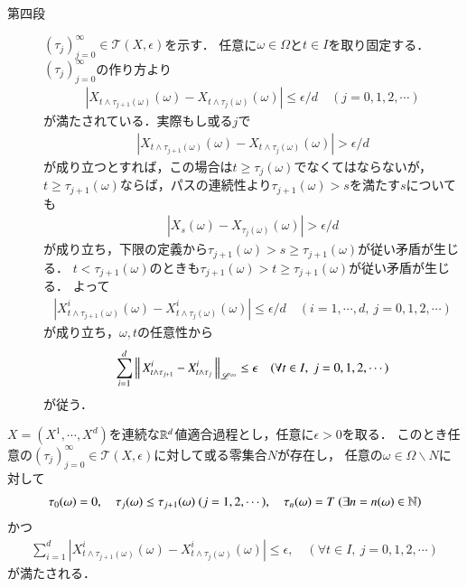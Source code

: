 \begin{prf}
\begin{description}
			\item[第四段]
				$(\tau_j)_{j=0}^{\infty} \in \mathcal{T}(X,\epsilon)$を示す．
				任意に$\omega \in \Omega$と$t \in I$を取り固定する．
				$(\tau_j)_{j=0}^{\infty}$の作り方より
				\begin{align}
					\left| X_{t \wedge \tau_{j+1}(\omega)}(\omega) - X_{t \wedge \tau_j(\omega)}(\omega) \right| \leq \epsilon/d
					\quad (j=0,1,2,\cdots)
				\end{align}
				が満たされている．実際もし或る$j$で
				\begin{align}
					\left| X_{t \wedge \tau_{j+1}(\omega)}(\omega) - X_{t \wedge \tau_j(\omega)}(\omega) \right| > \epsilon/d
				\end{align}
				が成り立つとすれば，この場合は$t \geq \tau_j(\omega)$でなくてはならないが，
				$t \geq \tau_{j+1}(\omega)$ならば，パスの連続性より$\tau_{j+1}(\omega) > s$を満たす$s$についても
				\begin{align}
					\left| X_s(\omega) - X_{\tau_j(\omega)}(\omega) \right| > \epsilon/d
				\end{align}
				が成り立ち，下限の定義から$\tau_{j+1}(\omega) > s \geq \tau_{j+1}(\omega)$が従い矛盾が生じる．
				$t < \tau_{j+1}(\omega)$のときも$\tau_{j+1}(\omega) > t \geq \tau_{j+1}(\omega)$が従い矛盾が生じる．
				よって
				\begin{align}
					\left| X^i_{t \wedge \tau_{j+1}(\omega)}(\omega) - X^i_{t \wedge \tau_j(\omega)}(\omega) \right| \leq \epsilon/d
					\quad (i=1,\cdots,d,\ j=0,1,2,\cdots)
				\end{align}
				が成り立ち，$\omega,t$の任意性から
				\begin{align}
					\sum_{i=1}^d\left\|\, X^i_{t \wedge \tau_{j+1}} - X^i_{t \wedge \tau_j}\, \right\|_{\mathscr{L}^\infty} \leq \epsilon
					\quad (\forall t \in I,\ j=0,1,2,\cdots)
				\end{align}
				が従う．
		\end{description}
		\QED
	\end{prf}
	
	\begin{screen}
		\begin{thm}[停止時刻によるパスの変動の制限]
			$X=(X^1,\cdots,X^d)$を連続な$\mathbb{R}^d$値適合過程とし，任意に$\epsilon > 0$を取る．
			このとき任意の$(\tau_j)_{j=0}^{\infty} \in \mathcal{T}(X,\epsilon)$に対して或る零集合$N$が存在し，
			任意の$\omega \in \Omega \backslash N$に対して
			\begin{align}
				\tau_0(\omega) = 0,\quad \tau_j(\omega) \leq \tau_{j+1}(\omega)\ (j=1,2,\cdots),\quad
				\tau_n(\omega) = T\ (\exists n = n(\omega) \in \mathbb{N})
			\end{align}
			かつ
			\begin{align}
				\sum_{i=1}^{d}\left| X_{t \wedge \tau_{j+1}(\omega)}^i(\omega) - X_{t \wedge \tau_j(\omega)}^i(\omega) \right| \leq \epsilon,
				\quad (\forall t \in I,\ j=0,1,2,\cdots)
			\end{align}
			が満たされる．
		\end{thm}
	\end{screen}
	
